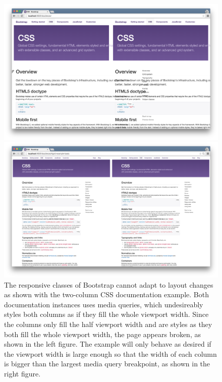 \documentclass[a4paper,11pt]{kth-mag}
\begin{document}
      \begin{figure}[htbp]
        \centering
        \begin{minipage}{.5\textwidth}
          \centering
          \includegraphics[width=\linewidth]{images/bootstrap-mq-header-small}
        \end{minipage}%
        \begin{minipage}{.5\textwidth}
          \centering
          \includegraphics[width=\linewidth]{images/bootstrap-mq-header-big}
        \end{minipage}
        \caption{
          The responsive classes of Bootstrap cannot adapt to layout changes as shown with the two-column \gls{CSS} documentation example. 
          Both documentation instances uses media queries, which undesireably styles both columns as if they fill the whole viewport width.
          Since the columns only fill the half viewport width and are styles as they both fill the whole viewport width, the page appears broken, as shown in the left figure.
          The example will only behave as desired if the viewport width is large enough so that the width of each column is bigger than the largest media query breakpoint, as shown in the right figure.}
        \label{fig:eval-bootstrap-mq-broken}
      \end{figure}
\end{document}
